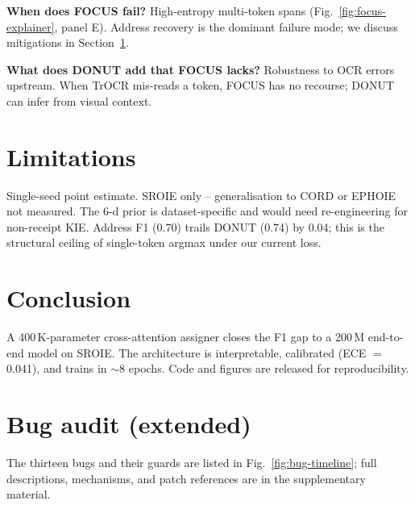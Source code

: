 \documentclass[conference]{IEEEtran}
\begin{document}
\textbf{When does FOCUS fail?} High-entropy multi-token spans
(Fig.~\ref{fig:focus-explainer}, panel E). Address recovery is the
dominant failure mode; we discuss mitigations in
Section~\ref{sec:limitations}.

\textbf{What does DONUT add that FOCUS lacks?} Robustness to OCR errors
upstream. When TrOCR mis-reads a token, FOCUS has no recourse; DONUT can
infer from visual context.

\section{Limitations}
\label{sec:limitations}
Single-seed point estimate. SROIE only -- generalisation to CORD or
EPHOIE not measured. The 6-d prior is dataset-specific and would need
re-engineering for non-receipt KIE. Address F1 (0.70) trails DONUT
(0.74) by 0.04; this is the structural ceiling of single-token argmax
under our current loss.

\section{Conclusion}
A 400\,K-parameter cross-attention assigner closes the F1 gap to a 200\,M
end-to-end model on SROIE. The architecture is interpretable, calibrated
(ECE $=$ 0.041), and trains in $\sim$8 epochs. Code and figures are
released for reproducibility.

\appendices
\section{Bug audit (extended)}
\label{app:bugs}
The thirteen bugs and their guards are listed in
Fig.~\ref{fig:bug-timeline}; full descriptions, mechanisms, and patch
references are in the supplementary material.



\end{document}
